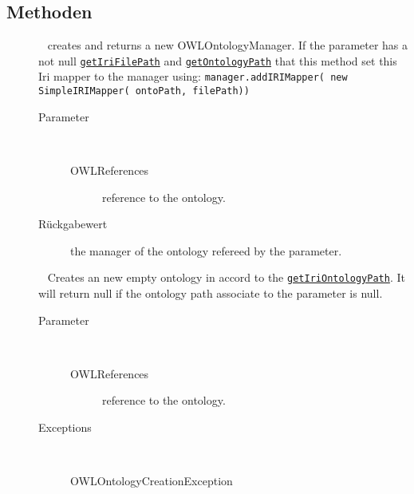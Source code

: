 \subsection{Methoden}
\begin{description}
\item[{\label{ontologyFramework.OFContextManagement.OWLLibrary.createOntologyManager(ontologyFramework.OFContextManagement.OWLReferences)}}]
~ creates and returns a new OWLOntologyManager. 
 If the parameter has a not null \texttt{\hyperlink{ontologyFramework.OFContextManagement.OWLReferences.getIriFilePath()}{getIriFilePath}} and
 \texttt{\hyperlink{ontologyFramework.OFContextManagement.OWLReferences.getOntologyPath()}{getOntologyPath}} that this method set this Iri mapper
 to the manager using: \verb!manager.addIRIMapper( new SimpleIRIMapper( ontoPath, filePath))!
\begin{description}
\item[Parameter] ~
\begin{description}
\item[OWLReferences]
reference to the ontology.
\end{description}
\item[Rückgabewert] 
the manager of the ontology refereed by the parameter.
\end{description}
\item[{\label{ontologyFramework.OFContextManagement.OWLLibrary.createOntology(ontologyFramework.OFContextManagement.OWLReferences)}}]
~ Creates an new empty ontology in accord to the 
 \texttt{\hyperlink{ontologyFramework.OFContextManagement.OWLReferences.getIriOntologyPath()}{getIriOntologyPath}}. It will return null 
 if the ontology path associate to the parameter is null.
\begin{description}
\item[Parameter] ~
\begin{description}
\item[OWLReferences]
reference to the ontology.
\end{description}
\item[Exceptions] ~
\begin{description}
\item[OWLOntologyCreationException]


\end{description}
\end{description}
\end{description}
